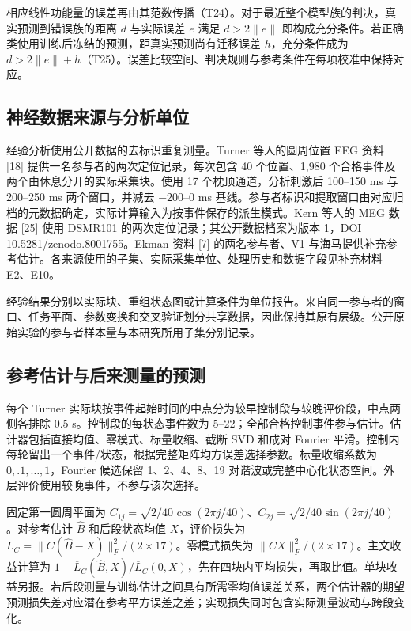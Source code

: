 \documentclass[11pt,a4paper]{article}
\begin{document}
相应线性功能量的误差再由其范数传播（T24）。对于最近整个模型族的判决，真实预测到错误族的距离
\(d\) 与实际误差 \(e\) 满足 \(d>2\|e\|\)
即构成充分条件。若正确类使用训练后冻结的预测，距真实预测尚有迁移误差
\(h\)，充分条件成为
\(d>2\|e\|+h\)（T25）。误差比较空间、判决规则与参考条件在每项校准中保持对应。

\subsection{神经数据来源与分析单位}\label{ux795eux7ecfux6570ux636eux6765ux6e90ux4e0eux5206ux6790ux5355ux4f4d}

经验分析使用公开数据的去标识重复测量。Turner 等人的圆周位置 EEG 资料
{[}18{]} 提供一名参与者的两次定位记录，每次包含 40 个位置、1,980
个合格事件及两个由休息分开的实际采集块。使用 17 个枕顶通道，分析刺激后
100–150 ms 与 200–250 ms 两个窗口，并减去 \(-200\)–0 ms
基线。参与者标识和提取窗口由对应归档的元数据确定，实际计算输入为按事件保存的派生模式。Kern
等人的 MEG 数据 {[}25{]} 使用 DSMR101
的两次定位记录；其公开数据档案为版本 1，DOI
10.5281/zenodo.8001755。Ekman 资料 {[}7{]} 的两名参与者、V1
与海马提供补充参考估计。各来源使用的子集、实际采集单位、处理历史和数据字段见补充材料
E2、E10。

经验结果分别以实际块、重组状态图或计算条件为单位报告。来自同一参与者的窗口、任务平面、参数变换和交叉验证划分共享数据，因此保持其原有层级。公开原始实验的参与者样本量与本研究所用子集分别记录。

\subsection{参考估计与后来测量的预测}\label{ux53c2ux8003ux4f30ux8ba1ux4e0eux540eux6765ux6d4bux91cfux7684ux9884ux6d4b}

每个 Turner
实际块按事件起始时间的中点分为较早控制段与较晚评价段，中点两侧各排除 0.5
s。控制段的每状态事件数为
5–22；全部合格控制事件参与估计。估计器包括直接均值、零模式、标量收缩、截断
SVD 和成对 Fourier
平滑。控制内每轮留出一个事件/状态，根据完整矩阵均方误差选择参数。标量收缩系数为
\(0,.1,\ldots,1\)，Fourier 候选保留 1、2、4、8、19
对谐波或完整中心化状态空间。外层评价使用较晚事件，不参与该次选择。

固定第一圆周平面为
\(C_{1j}=\sqrt{2/40}\cos(2\pi j/40)\)、\(C_{2j}=\sqrt{2/40}\sin(2\pi j/40)\)。对参考估计
\(\widehat B\) 和后段状态均值 \(X\)，评价损失为
\(L_C=\|C(\widehat B-X)\|_F^2/(2\times17)\)。零模式损失为
\(\|CX\|_F^2/(2\times17)\)。主文收益计算为
\(1-\overline L_C(\widehat B,X)/\overline L_C(0,X)\)，先在四块内平均损失，再取比值。单块收益另报。若后段测量与训练估计之间具有所需零均值误差关系，两个估计器的期望预测损失差对应潜在参考平方误差之差；实现损失同时包含实际测量波动与跨段变化。
\end{document}
